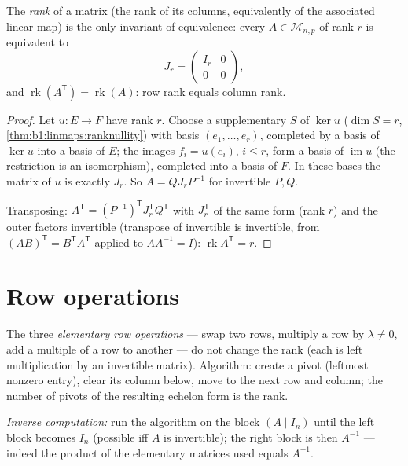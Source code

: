 \begin{theorem}\label{thm:b1:matrices:rank}
The \emph{rank} of a matrix (the rank of its columns, equivalently
of the associated linear map) is the only invariant of equivalence:
every $A \in \mathcal{M}_{n,p}$ of rank $r$ is equivalent to
\[
J_r = \begin{pmatrix} I_r & 0 \\ 0 & 0 \end{pmatrix},
\]
and $\operatorname{rk}(A^{\mathsf T}) = \operatorname{rk}(A)$: row rank
equals column rank.
\end{theorem}

\begin{proof}
Let $u \colon E \to F$ have rank $r$. Choose a supplementary $S$ of
$\ker u$ ($\dim S = r$, \cref{thm:b1:linmaps:ranknullity}) with
basis $(e_1, \dots, e_r)$, completed by a basis of $\ker u$ into a
basis of $E$; the images $f_i = u(e_i)$, $i \leq r$, form a basis of
$\operatorname{im} u$ (the restriction is an isomorphism), completed
into a basis of $F$. In these bases the matrix of $u$ is exactly
$J_r$. So $A = Q J_r P^{-1}$ for invertible $P, Q$.

Transposing: $A^{\mathsf T} = (P^{-1})^{\mathsf T} J_r^{\mathsf T} Q^{\mathsf T}$
with $J_r^{\mathsf T}$ of the same form (rank $r$) and the outer
factors invertible (transpose of invertible is invertible, from
$(AB)^{\mathsf T} = B^{\mathsf T}A^{\mathsf T}$ applied to $AA^{-1} = I$):
$\operatorname{rk} A^{\mathsf T} = r$.
\end{proof}

\section{Row operations}

\begin{method}\label{met:b1:matrices:gauss}
The three \emph{elementary row operations} ---
swap two rows, multiply a row by $\lambda \neq 0$, add a multiple of
a row to another --- do not change the rank (each is left
multiplication by an invertible matrix). Algorithm: create a pivot
(leftmost nonzero entry), clear its column below, move to the next
row and column; the number of pivots of the resulting echelon form
is the rank.

\emph{Inverse computation:} run the algorithm on the block $(A \mid
I_n)$ until the left block becomes $I_n$ (possible iff $A$ is
invertible); the right block is then $A^{-1}$ --- indeed the product
of the elementary matrices used equals $A^{-1}$.
\end{method}

